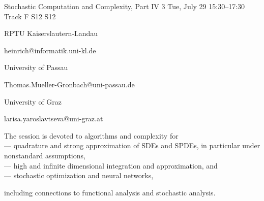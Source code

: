 \begin{talk}
  {Stochastic Computation and Complexity, Part IV}%
  {3}%
  {}%
  {}%
  {}%
  {}%
  {Tue, July 29 15:30–17:30 Track F}%
  {S12}%
  {S12}%


  {%


	{RPTU Kaiserslautern-Landau}%


	{heinrich@informatik.uni-kl.de}}%


 {%


{University of Passau}%


    {Thomas.Mueller-Gronbach@uni-passau.de}}%


  {%


	{University of Graz}%


	{larisa.yaroslavtseva@uni-graz.at}}%





The session is devoted to algorithms and complexity for\\





--- quadrature and strong approximation of SDEs and SPDEs, in particular under nonstandard assumptions,\\





--- high and infinite dimensional integration and approximation, and\\





--- stochastic optimization and neural networks,





including connections to functional analysis and stochastic analysis.








\medskip






\end{talk}
